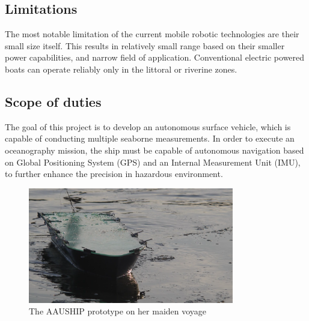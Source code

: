\subsection*{Limitations}

The most notable limitation of the current mobile robotic technologies are their small size itself. This results in relatively small range based on their smaller power capabilities, and narrow field of application. Conventional electric powered boats can operate reliably only in the littoral or riverine zones.

\subsection*{Scope of duties}

The goal of this project is to develop an autonomous surface vehicle, which is capable of conducting multiple seaborne measurements. In order to execute an oceanography mission, the ship must be capable of autonomous navigation based on Global Positioning System (GPS) and an Internal Measurement Unit (IMU), to further enhance the precision in hazardous environment.

\begin{figure}[H]
	\centering
	\includegraphics[width=0.8\textwidth]{img/aauship}
	\caption{The AAUSHIP prototype on her maiden voyage}
	\label{fig:aauship}
\end{figure}

